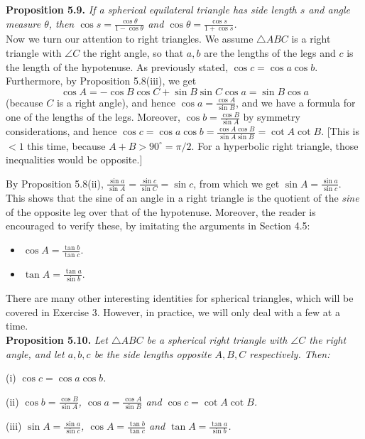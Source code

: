 \documentclass[leqno]{book}
\begin{document}
\noindent\textbf{Proposition 5.9.} \emph{If a spherical equilateral triangle has side length $s$ and angle measure $\theta$, then $\cos s=\frac{\cos\theta}{1-\cos\theta}$ and $\cos\theta=\frac{\cos s}{1+\cos s}$.}\\

\noindent Now we turn our attention to right triangles.  We assume $\triangle ABC$ is a right triangle with $\angle C$ the right angle, so that $a,b$ are the lengths of the legs and $c$ is the length of the hypotenuse.  As previously stated, $\cos c=\cos a\cos b$.  Furthermore, by Proposition 5.8(iii), we get
$$\cos A=-\cos B\cos C+\sin B\sin C\cos a=\sin B\cos a$$
(because $C$ is a right angle), and hence $\cos a=\frac{\cos A}{\sin B}$, and we have a formula for one of the lengths of the legs.  Moreover, $\cos b=\frac{\cos B}{\sin A}$ by symmetry considerations, and hence $\cos c=\cos a\cos b=\frac{\cos A\cos B}{\sin A\sin B}=\cot A\cot B$.  [This is $<1$ this time, because $A+B>90^\circ=\pi/2$.  For a hyperbolic right triangle, those inequalities would be opposite.]

By Proposition 5.8(ii), $\frac{\sin a}{\sin A}=\frac{\sin c}{\sin C}=\sin c$, from which we get $\sin A=\frac{\sin a}{\sin c}$.  This shows that the sine of an angle in a right triangle is the quotient of the \emph{sine} of the opposite leg over that of the hypotenuse.  Moreover, the reader is encouraged to verify these, by imitating the arguments in Section 4.5:
\begin{itemize}
\item $\cos A=\frac{\tan b}{\tan c}$.

\item $\tan A=\frac{\tan a}{\sin b}$.
\end{itemize}
There are many other interesting identities for spherical triangles, which will be covered in Exercise 3.  However, in practice, we will only deal with a few at a time.\\

\noindent\textbf{Proposition 5.10.} \emph{Let $\triangle ABC$ be a spherical right triangle with $\angle C$ the right angle, and let $a,b,c$ be the side lengths opposite $A,B,C$ respectively.  Then:}

(i) \emph{$\cos c=\cos a\cos b$.}

(ii) \emph{$\cos b=\frac{\cos B}{\sin A}$, $\cos a=\frac{\cos A}{\sin B}$ and $\cos c=\cot A\cot B$.}

(iii) \emph{$\sin A=\frac{\sin a}{\sin c}$, $\cos A=\frac{\tan b}{\tan c}$ and $\tan A=\frac{\tan a}{\sin b}$.}\\
\end{document}
